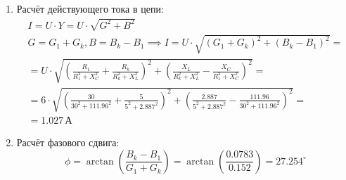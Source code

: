 \begin{enumerate}
	\item Расчёт действующего тока в цепи:
	      \[
		      \begin{gathered}
			      I = U \cdot Y = U \cdot \sqrt{G^2 + B^2} \\
			      G = G_1+G_k, B = B_k-B_1 \implies I = U \cdot \sqrt{(G_1+G_k)^2+(B_k-B_1)^2} = \\
			      = U \cdot \sqrt{\left(\frac{R_1}{R_1^2+X_C^2}+\frac{R_k}{R_k^2+X_L^2}\right)^2+\left(\frac{X_L}{R_k^2+X_L^2}-\frac{X_C}{R_1^2+X_C^2}\right)^2} = \\
			      = 6 \cdot \sqrt{\left(\frac{30}{30^2+111.96^2}+\frac{5}{5^2+2.887^2}\right)^2+\left(\frac{2.887}{5^2+2.887^2}-\frac{111.96}{30^2+111.96^2}\right)^2} = \\
			      = 1.027 \, \text{А}
		      \end{gathered}
	      \]
	\item Расчёт фазового сдвига:
	      \[
		      \phi = \arctan\left(\frac{B_k-B_1}{G_1+G_k}\right) = \arctan\left(\frac{0.0783}{0.152}\right) = 27.254^{\circ}
	      \]
\end{enumerate}
